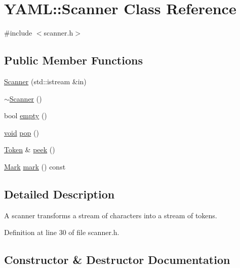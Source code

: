\hypertarget{class_y_a_m_l_1_1_scanner}{}\section{Y\+A\+ML\+::Scanner Class Reference}
\label{class_y_a_m_l_1_1_scanner}


{\ttfamily \#include $<$scanner.\+h$>$}

\subsection*{Public Member Functions}
\begin{DoxyCompactItemize}
\item 
\mbox{\hyperlink{class_y_a_m_l_1_1_scanner_aea23d10585c1509e61ab0bd488d3fde2}{Scanner}} (std\+::istream \&in)
\item 
\mbox{\hyperlink{class_y_a_m_l_1_1_scanner_a0ac4b5ac07f864a667f3e742b149a304}{$\sim$\+Scanner}} ()
\item 
bool \mbox{\hyperlink{class_y_a_m_l_1_1_scanner_aca838c1612fbd22188f9d912c90e1129}{empty}} ()
\item 
\mbox{\hyperlink{glad_8h_a950fc91edb4504f62f1c577bf4727c29}{void}} \mbox{\hyperlink{class_y_a_m_l_1_1_scanner_a59105995d1326628b33b330299e5db4e}{pop}} ()
\item 
\mbox{\hyperlink{struct_y_a_m_l_1_1_token}{Token}} \& \mbox{\hyperlink{class_y_a_m_l_1_1_scanner_a65433ee930cad573a7f82da86f91c80d}{peek}} ()
\item 
\mbox{\hyperlink{struct_y_a_m_l_1_1_mark}{Mark}} \mbox{\hyperlink{class_y_a_m_l_1_1_scanner_ac2ea7a607ea1d3e96dfbf090b0c29e0a}{mark}} () const
\end{DoxyCompactItemize}


\subsection{Detailed Description}
A scanner transforms a stream of characters into a stream of tokens. 

Definition at line 30 of file scanner.\+h.



\subsection{Constructor \& Destructor Documentation}
\mbox{\label{class_y_a_m_l_1_1_scanner_aea23d10585c1509e61ab0bd488d3fde2}} 
